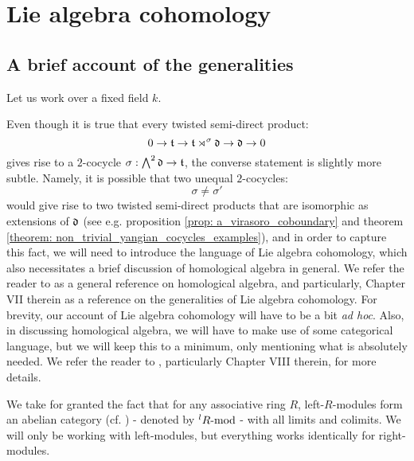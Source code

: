 \section{Lie algebra cohomology}
    \subsection{A brief account of the generalities}
        Let us work over a fixed field $k$.
    
        Even though it is true that every twisted semi-direct product:
            $$0 \to \t \to \t \rtimes^{\sigma} \d \to \d \to 0$$
        gives rise to a $2$-cocycle $\sigma: \bigwedge^2 \d \to \t$, the converse statement is slightly more subtle. Namely, it is possible that two unequal $2$-cocycles:
            $$\sigma \not = \sigma'$$
        would give rise to two twisted semi-direct products that are isomorphic as extensions of $\d$ (see e.g. proposition \ref{prop: a_virasoro_coboundary} and theorem \ref{theorem: non_trivial_yangian_cocycles_examples}), and in order to capture this fact, we will need to introduce the language of Lie algebra cohomology, which also necessitates a brief discussion of homological algebra in general. We refer the reader to \cite{hilton_stammbach_homological_algebra} as a general reference on homological algebra, and particularly, Chapter VII therein as a reference on the generalities of Lie algebra cohomology. For brevity, our account of Lie algebra cohomology will have to be a bit \textit{ad hoc}. Also, in discussing homological algebra, we will have to make use of some categorical language, but we will keep this to a minimum, only mentioning what is absolutely needed. We refer the reader to \cite{maclane}, particularly Chapter VIII therein, for more details.
        
        We take for granted the fact that for any associative ring $R$, left-$R$-modules form an abelian category (cf. \cite[Section VIII.3, p. 198]{maclane}) - denoted by ${}^lR\mod$ - with all limits and colimits. We will only be working with left-modules, but everything works identically for right-modules.

